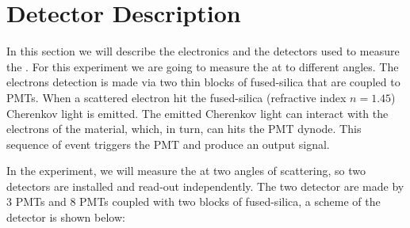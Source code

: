 \newpage
\section{Detector Description}

In this section we will describe the electronics and the detectors used to measure the \transv .
For this experiment we are going to measure the \transv at to different angles. The electrons detection is 
made via two thin blocks of fused-silica that are coupled to PMTs. When a scattered electron hit the fused-silica (refractive index $n = 1.45$) Cherenkov light is emitted. The emitted Cherenkov light can interact with the electrons of the material, which, in turn, can hits the PMT dynode. This sequence of event triggers the PMT and produce an output signal.

In the experiment, we will measure the \transv at two angles of scattering, so two detectors are installed and read-out independently. The two detector are made by 3 PMTs and 8 PMTs coupled with two blocks of fused-silica, a scheme of the detector is shown below:

\begin{figure}[hbtp]
\centering
{}
\end{figure}


